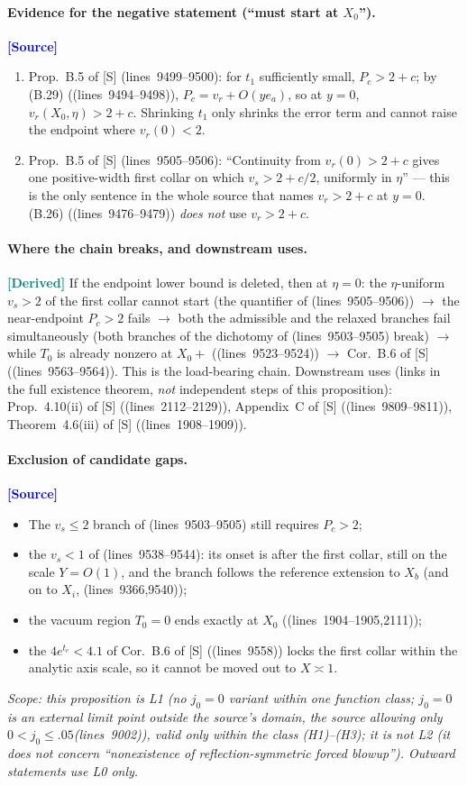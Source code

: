 \documentclass[11pt,a4paper]{article}
\theoremstyle{definition}
\theoremstyle{remark}
\newcommand{\lnos}[1]{(lines~#1)}
\newcommand{\ORIG}{\textcolor{blue}{\textbf{[Source]}}}
\newcommand{\DER}{\textcolor{teal}{\textbf{[Derived]}}}
\begin{document}
\paragraph{Evidence for the negative statement (``must start at $X_0$'').}
\ORIG
\begin{enumerate}
\item Prop.~B.5 of [S] \lnos{9499--9500}: for $t_1$ sufficiently small, $P_c>2+c$; by (B.29)
(\lnos{9494--9498}), $P_c=v_r+O(ye_a)$, so at $y=0$, $v_r(X_0,\eta)>2+c$. Shrinking $t_1$ only
shrinks the error term and cannot raise the endpoint where $v_r(0)<2$.
\item Prop.~B.5 of [S] \lnos{9505--9506}: ``Continuity from $v_r(0)>2+c$ gives one positive-width
first collar on which $v_s>2+c/2$, uniformly in $\eta$'' --- this is the only sentence in the whole
source that names $v_r>2+c$ at $y=0$. (B.26) (\lnos{9476--9479}) \emph{does not} use $v_r>2+c$.
\end{enumerate}

\paragraph{Where the chain breaks, and downstream uses.}
\DER
If the endpoint lower bound is deleted, then at $\eta=0$: the $\eta$-uniform $v_s>2$ of the first
collar cannot start (the quantifier of \lnos{9505--9506}) $\to$ the near-endpoint $P_c>2$ fails $\to$
both the admissible and the relaxed branches fail simultaneously (both branches of the dichotomy of
\lnos{9503--9505} break) $\to$ while $T_0$ is already nonzero at $X_0+$ (\lnos{9523--9524}) $\to$
Cor.~B.6 of [S] (\lnos{9563--9564}). This is the load-bearing chain.
Downstream uses (links in the full existence theorem, \emph{not} independent steps of this proposition):
Prop.~4.10(ii) of [S] (\lnos{2112--2129}), Appendix~C of [S] (\lnos{9809--9811}),
Theorem~4.6(iii) of [S] (\lnos{1908--1909}).

\paragraph{Exclusion of candidate gaps.}
\ORIG
\begin{itemize}
\item The $v_s\le 2$ branch of \lnos{9503--9505} still requires $P_c>2$;
\item the $v_s<1$ of \lnos{9538--9544}: its onset is after the first collar, still on the scale
$Y=O(1)$, and the branch follows the reference extension to $X_b$ (and on to $X_i$, \lnos{9366,9540});
\item the vacuum region $T_0=0$ ends exactly at $X_0$ (\lnos{1904--1905,2111});
\item the $4e^{t_c}<4.1$ of Cor.~B.6 of [S] (\lnos{9558}) locks the first collar within the analytic
axis scale, so it cannot be moved out to $X\asymp 1$.
\end{itemize}
\emph{Scope: this proposition is L1 (no $j_0=0$ variant within one function class; $j_0=0$ is an
external limit point outside the source's domain, the source allowing only $0<j_0\le.05$\lnos{9002}),
valid only within the class (H1)--(H3); it is not L2 (it does not concern ``nonexistence of
reflection-symmetric forced blowup''). Outward statements use L0 only.}
\end{document}
